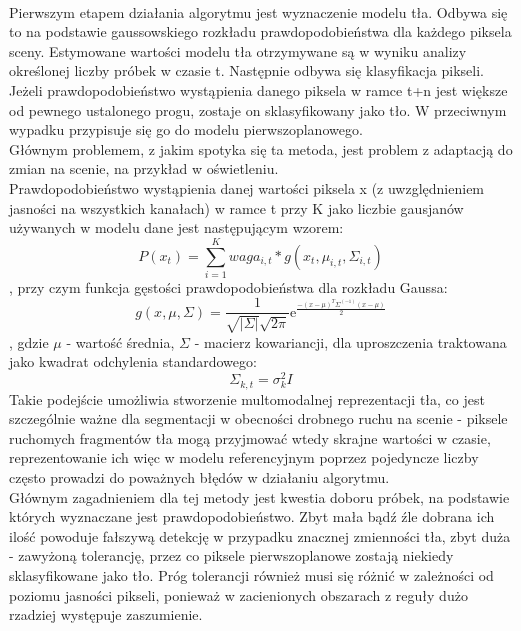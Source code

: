 \paragraph{}
Pierwszym etapem działania algorytmu jest wyznaczenie modelu tła. Odbywa się to na podstawie gaussowskiego rozkładu prawdopodobieństwa dla każdego piksela sceny. Estymowane wartości modelu tła otrzymywane są w wyniku analizy określonej liczby próbek w czasie t. Następnie odbywa się klasyfikacja pikseli. Jeżeli prawdopodobieństwo wystąpienia danego piksela w ramce t+n jest większe od pewnego ustalonego progu, zostaje on sklasyfikowany jako tło. W przeciwnym wypadku przypisuje się go do modelu pierwszoplanowego.\\
Głównym problemem, z jakim spotyka się ta metoda, jest problem z adaptacją do zmian na scenie, na przykład w oświetleniu.\\
Prawdopodobieństwo wystąpienia danej wartości piksela x (z uwzględnieniem jasności na wszystkich kanałach) w ramce t przy K jako liczbie gausjanów używanych w modelu dane jest następującym wzorem:
\begin{equation}
P(x_{t}) = \sum_{i=1}^{K} waga_{i,t}*g(x_{t},\mu_{i,t},\Sigma_{i,t})
\end{equation}
, przy czym funkcja gęstości prawdopodobieństwa dla rozkładu Gaussa:
\begin{equation}
g(x,\mu,\Sigma) = \frac{1}{\sqrt{|\Sigma|}\sqrt{2\pi}}\mathrm{e}^\frac{-(x-\mu)^T\Sigma^(-1)(x-\mu)}{2}
\end{equation}
, gdzie $\mu$ - wartość średnia, $\Sigma$ - macierz kowariancji, dla uproszczenia traktowana jako kwadrat odchylenia standardowego:
\begin{equation}
\Sigma_{k,t}=\sigma_{k}^2I
\end{equation}
Takie podejście umożliwia stworzenie multomodalnej reprezentacji tła, co jest szczególnie ważne dla segmentacji w obecności drobnego ruchu na scenie - piksele ruchomych fragmentów tła mogą przyjmować wtedy skrajne wartości w czasie, reprezentowanie ich więc w modelu referencyjnym poprzez pojedyncze liczby często prowadzi do poważnych błędów w działaniu algorytmu. \\ 
Głównym zagadnieniem dla tej metody jest kwestia doboru próbek, na podstawie których wyznaczane jest prawdopodobieństwo. Zbyt mała bądź źle dobrana ich ilość powoduje fałszywą detekcję w przypadku znacznej zmienności tła, zbyt duża - zawyżoną tolerancję, przez co piksele pierwszoplanowe zostają niekiedy sklasyfikowane jako tło. Próg tolerancji również musi się różnić w zależności od poziomu jasności pikseli, ponieważ w zacienionych obszarach z reguły dużo rzadziej występuje zaszumienie.


